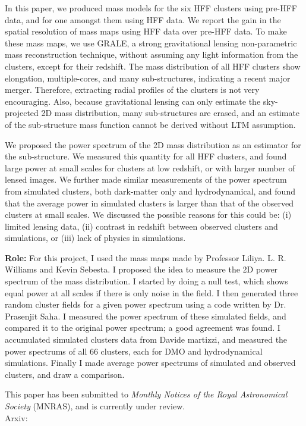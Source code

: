 In this paper, we produced mass models for the six HFF clusters using pre-HFF
data, and for one amongst them using HFF data. We report the gain in the
spatial resolution of mass maps using HFF data over pre-HFF data. To make
these mass maps, we use GRALE, a strong gravitational lensing non-parametric 
mass reconstruction technique, without assuming any light information from
the clusters, except for their redshift. The mass distribution of all HFF
clusters show elongation, multiple-cores, and many sub-structures, 
indicating a recent major merger. Therefore, extracting radial profiles
of the clusters is not very encouraging. Also, because gravitational lensing
can only estimate the sky-projected 2D mass distribution, many sub-structures
are erased, and an estimate of the sub-structure mass function
cannot be derived without LTM assumption. 

We proposed the power spectrum of the 2D mass distribution as an estimator
for the sub-structure. We measured this quantity for all HFF clusters, and 
found large power at small scales for clusters at low redshift, or with
larger number of lensed images. We further made similar measurements of the
power spectrum from simulated clusters, both dark-matter only and 
hydrodynamical, and
found that the average power in simulated clusters is larger than that
of the observed clusters at small scales. We discussed the possible reasons
for this could be: (i) limited lensing data, (ii) contrast in redshift between
observed clusters and simulations, or (iii) lack of physics in simulations.


{\bf Role:} For this project, I used the mass maps made by Professor
Liliya. L. R. Williams and Kevin Sebesta. 
I proposed the idea to measure the 2D power spectrum
of the mass distribution. I started
by doing a null test, which shows equal power at all scales if there is
only noise in the field. I then generated three random cluster fields 
for a given power spectrum using a code written by Dr. Prasenjit Saha. I 
measured the power spectrum of these simulated fields, and compared it to 
the original power spectrum; a good agreement was found. I accumulated 
simulated clusters data from Davide martizzi, and measured the power spectrums
of all 66 clusters, each for DMO and hydrodynamical simulations. Finally 
I made average power spectrums of simulated and observed clusters, and
draw a comparison.









This paper has been submitted to {\it Monthly Notices of the Royal Astronomical
Society} (MNRAS), and is currently under review.
\\
Arxiv: \url{}

\clearpage
